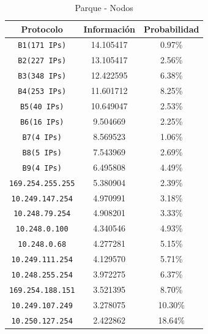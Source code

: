 \documentclass[final,inline,narroweqnarray,a4paper]{ieee}
\begin{document}
\begin{table}[H]
    \begin{center}
        \begin{tabular}{|c|c|c|}
            \hline
            \textbf{Protocolo} & \textbf{Información} & \textbf{Probabilidad} \\ \hline
            \texttt{B1(171 IPs)}    &14.105417        & 0.97\%     \\ \hline
            \texttt{B2(227 IPs)}    &13.105417        & 2.56\%     \\ \hline
            \texttt{B3(348 IPs)}    &12.422595        & 6.38\%     \\ \hline
            \texttt{B4(253 IPs)}    &11.601712        & 8.25\%     \\ \hline
            \texttt{B5(40 IPs)}     &10.649047        & 2.53\%     \\ \hline
            \texttt{B6(16 IPs)}     &9.504669         & 2.25\%     \\ \hline       
            \texttt{B7(4 IPs)}      &8.569523         & 1.06\%     \\ \hline
            \texttt{B8(5 IPs)}      &7.543969         & 2.69\%     \\ \hline
            \texttt{B9(4 IPs)}      &6.495808         & 4.49\%     \\ \hline
            \texttt{169.254.255.255} &5.380904        & 2.39\%     \\ \hline 
            \texttt{10.249.147.254} &4.970991         & 3.18\%     \\ \hline 
            \texttt{10.248.79.254} &4.908201          & 3.33\%     \\ \hline 
            \texttt{10.248.0.100} &4.340546           & 4.93\%     \\ \hline 
            \texttt{10.248.0.68} &4.277281            & 5.15\%     \\ \hline 
            \texttt{10.249.111.254} &4.129570         & 5.71\%     \\ \hline 
            \texttt{10.248.255.254} &3.972275         & 6.37\%     \\ \hline 
            \texttt{169.254.188.151} &3.521395        & 8.70\%     \\ \hline 
            \texttt{10.249.107.249} &3.278075         &10.30\%     \\ \hline 
            \texttt{10.250.127.254} &2.422862         &18.64\%     \\ \hline
        \end{tabular}
        \caption{Parque - Nodos}
        \label{table:parqueS1}
    \end{center}
\end{table}
\end{document}
